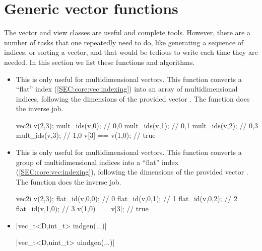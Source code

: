 \documentclass[12pt]{report}
\newenvironment{example}
{
    \begin{mdframed}[style=example,frametitle={Example}]
}
{
    \end{mdframed}
}
\begin{document}
\section{Generic vector functions \label{SEC:support:generic}}

The vector and view classes are useful and complete tools. However, there are a number of tasks that one repeatedly need to do, like generating a sequence of indices, or sorting a vector, and that would be tedious to write each time they are needed. In this section we list these functions and algorithms.

\begin{itemize}

\item {}

This is only useful for multidimensional vectors. This function converts a ``flat'' index  (\ref{SEC:core:vec:indexing}) into an array of multidimensional indices, following the dimensions of the provided vector . The  function does the inverse job.

\begin{example}
\begin{cppcode}
vec2i v(2,3);
mult_ids(v,0); // {0,0}
mult_ids(v,1); // {0,1}
mult_ids(v,2); // {0,3}
mult_ids(v,3); // {1,0}
v[3] == v(1,0); // true
\end{cppcode}
\end{example}

\item {}

This is only useful for multidimensional vectors. This function converts a group of multidimensional indices into a ``flat'' index (\ref{SEC:core:vec:indexing}), following the dimensions of the provided vector . The  function does the inverse job.

\begin{example}
\begin{cppcode}
vec2i v(2,3);
flat_id(v,0,0); // 0
flat_id(v,0,1); // 1
flat_id(v,0,2); // 2
flat_id(v,1,0); // 3
v(1,0) == v[3]; // true
\end{cppcode}
\end{example}

\item \cppinline|vec_t<D,int_t>  indgen(...)| 

\cppinline|vec_t<D,uint_t> uindgen(...)| 


\end{itemize}
\end{document}
